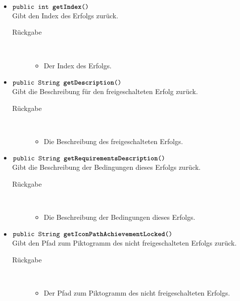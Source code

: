 \begin{description}
\begin{itemize}
		\item $\texttt{public int \textbf{getIndex}()}$ \\ Gibt den Index des Erfolgs zurück.
				\begin{description}
					\item[Rückgabe] \hfill \\
					\vspace{-.8cm}
					\begin{itemize}
						\item Der Index des Erfolgs.
					\end{itemize}
				\end{description}
		
		\item $\texttt{public String \textbf{getDescription}()}$ \\ Gibt die Beschreibung für den freigeschalteten Erfolg zurück.
				\begin{description}
					\item[Rückgabe] \hfill \\
					\vspace{-.8cm}
					\begin{itemize}
						\item Die Beschreibung des freigeschalteten Erfolgs.
					\end{itemize}
				\end{description}
		
		\item $\texttt{public String \textbf{getRequirementsDescription}()}$ \\ Gibt die Beschreibung der Bedingungen dieses Erfolgs zurück.
				\begin{description}
					\item[Rückgabe] \hfill \\
					\vspace{-.8cm}
					\begin{itemize}
						\item Die Beschreibung der Bedingungen dieses Erfolgs.
					\end{itemize}
				\end{description}
		
		\item $\texttt{public String \textbf{getIconPathAchievementLocked}()}$ \\ Gibt den Pfad zum Piktogramm des nicht freigeschalteten Erfolgs zurück.
				\begin{description}
					\item[Rückgabe] \hfill \\
					\vspace{-.8cm}
					\begin{itemize}
						\item Der Pfad zum Piktogramm des nicht freigeschalteten Erfolgs.
					\end{itemize}
				\end{description}
		

\end{itemize}
\end{description}
